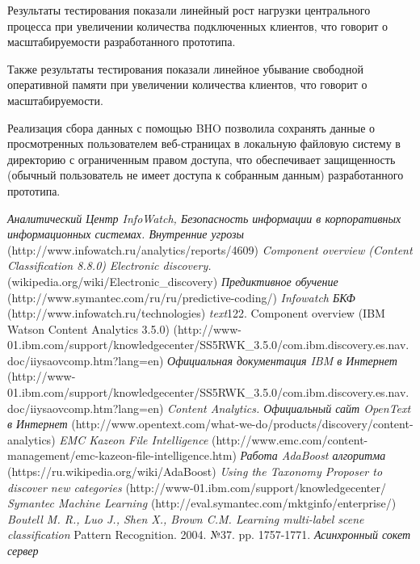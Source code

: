 \documentclass[russian, utf8, emptystyle]{eskdtext}
\begin{document}
Результаты тестирования показали линейный рост нагрузки центрального процесса при увеличении количества подключенных клиентов, что говорит о масштабируемости разработанного прототипа.

Также результаты тестирования показали линейное убывание свободной оперативной памяти при увеличении количества клиентов, что говорит о масштабируемости.

Реализация сбора данных с помощью BHO позволила сохранять данные о просмотренных пользователем веб-страницах в локальную файловую систему в директорию с ограниченным правом доступа, что обеспечивает защищенность (обычный пользователь не имеет доступа к собранным данным) разработанного прототипа.
\begin{thebibliography}{50}
	\textit {Аналитический Центр InfoWatch, Безопасность информации в корпоративных информационных системах. Внутренние угрозы}
	{(http://www.infowatch.ru/analytics/reports/4609)}
	\textit {Component overview (Content Classification 8.8.0)}
	\textit{Electronic discovery.}
	{(wikipedia.org/wiki/Electronic\_discovery)}
	\textit {Предиктивное обучение}
	{(http://www.symantec.com/ru/ru/predictive-coding/)}
	\textit {Infowatch БКФ }
	{(http://www.infowatch.ru/technologies)}
	\textit{text}{122.	Component overview (IBM Watson Content Analytics 3.5.0)}
	{(http://www-01.ibm.com/support/knowledgecenter/SS5RWK\_3.5.0/com.ibm.discovery.es.nav.doc/iiysaovcomp.htm?lang=en)}
	\textit{Официальная документация IBM в Интернет}
	{(http://www-01.ibm.com/support/knowledgecenter/SS5RWK\_3.5.0/com.ibm.discovery.es.nav.doc/iiysaovcomp.htm?lang=en)}
	\textit{Content Analytics. Официальный сайт OpenText в Интернет}
	{(http://www.opentext.com/what-we-do/products/discovery/content-analytics)}
	\textit{EMC Kazeon File Intelligence}
	{(http://www.emc.com/content-management/emc-kazeon-file-intelligence.htm)}
	\textit{Работа AdaBoost алгоритма}
	{(https://ru.wikipedia.org/wiki/AdaBoost)}
	\textit{Using the Taxonomy Proposer to discover new categories}
	{(http://www-01.ibm.com/support/knowledgecenter/}
	\textit {Symantec Machine Learning}
	{(http://eval.symantec.com/mktginfo/enterprise/)}
	\textit{Boutell M. R., Luo J., Shen X., Brown C.M. Learning multi-label scene classification }
	{Pattern Recognition. 2004. №37. pp. 1757-1771.}
	\textit{Асинхронный сокет сервер}

\end{thebibliography}
\end{document}
